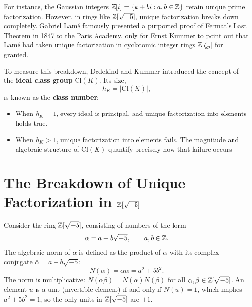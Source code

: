 \documentclass[a4paper]{article}
\begin{document}
For instance, the Gaussian integers $\mathbb{Z}[i] = \{a + bi : a, b \in \mathbb{Z}\}$ retain unique prime factorization. However, in rings like $\mathbb{Z}[\sqrt{-5}]$, unique factorization breaks down completely. Gabriel Lam\'e famously presented a purported proof of Fermat's Last Theorem in 1847 to the Paris Academy, only for Ernst Kummer to point out that Lam\'e had taken unique factorization in cyclotomic integer rings $\mathbb{Z}[\zeta_p]$ for granted.

To measure this breakdown, Dedekind and Kummer introduced the concept of the \textbf{ideal class group} $\mathrm{Cl}(K)$. Its size,
\begin{equation}
 h_K = |\mathrm{Cl}(K)|,
\end{equation}
is known as the \textbf{class number}:
\begin{itemize}[leftmargin=2em]
 \item When $h_K = 1$, every ideal is principal, and unique factorization into elements holds true.
 \item When $h_K > 1$, unique factorization into elements fails. The magnitude and algebraic structure of $\mathrm{Cl}(K)$ quantify precisely how that failure occurs.
\end{itemize}

\section{The Breakdown of Unique Factorization in \texorpdfstring{$\mathbb{Z}[\sqrt{-5}]$}{Z[sqrt(-5)]}}
\label{sec:breakdown}
Consider the ring $\mathbb{Z}[\sqrt{-5}]$, consisting of numbers of the form
\begin{equation}
 \alpha = a + b\sqrt{-5}, \qquad a, b \in \mathbb{Z}.
\end{equation}
The algebraic norm of $\alpha$ is defined as the product of $\alpha$ with its complex conjugate $\bar{\alpha} = a - b\sqrt{-5}$:
\begin{equation}
 N(\alpha) = \alpha \bar{\alpha} = a^2 + 5b^2.
 \label{eq:norm_def}
\end{equation}
The norm is multiplicative: $N(\alpha \beta) = N(\alpha) N(\beta)$ for all $\alpha, \beta \in \mathbb{Z}[\sqrt{-5}]$. An element $u$ is a unit (invertible element) if and only if $N(u) = 1$, which implies $a^2 + 5b^2 = 1$, so the only units in $\mathbb{Z}[\sqrt{-5}]$ are $\pm 1$.
\end{document}
